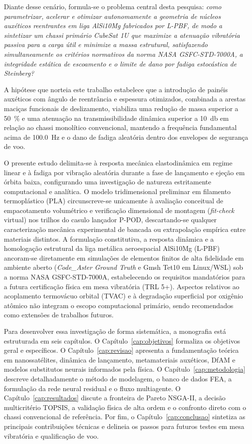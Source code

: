 Diante desse cenário, formula-se o problema central desta pesquisa: \textit{como parametrizar, acelerar e otimizar autonomamente a geometria de núcleos auxéticos reentrantes em liga AlSi10Mg fabricados por L-PBF, de modo a sintetizar um chassi primário CubeSat 1U que maximize a atenuação vibratória passiva para a carga útil e minimize a massa estrutural, satisfazendo simultaneamente os critérios normativos da norma NASA GSFC-STD-7000A, a integridade estática de escoamento e o limite de dano por fadiga estocástica de Steinberg?}

A hipótese que norteia este trabalho estabelece que a introdução de painéis auxéticos com ângulo de reentrância e espessura otimizados, combinada a arestas maciças funcionais de deslizamento, viabiliza uma redução de massa superior a \SI{50}{\percent} e uma atenuação na transmissibilidade dinâmica superior a \SI{10}{\decibel} em relação ao chassi monolítico convencional, mantendo a frequência fundamental acima de \SI{100.0}{\hertz} e o dano de fadiga aleatória dentro dos envelopes de segurança de voo.

O presente estudo delimita-se à resposta mecânica elastodinâmica em regime linear e à fadiga por vibração aleatória durante a fase de lançamento e ejeção em órbita baixa, configurando uma investigação de natureza estritamente computacional e analítica. O modelo tridimensional preliminar em filamento termoplástico (PLA) circunscreve-se unicamente à avaliação conceitual de empacotamento volumétrico e verificação dimensional de montagem (\textit{fit-check} virtual) nos trilhos do casulo lançador P-POD, descartando-se qualquer caracterização mecânica experimental de bancada ou extrapolação empírica entre materiais distintos. A formulação constitutiva, a resposta dinâmica e a homologação estrutural da liga metálica aeroespacial AlSi10Mg (L-PBF) ancoram-se diretamente em simulações de elementos finitos de alta fidelidade em ambiente aberto (\textit{Code\_Aster Ground Truth} e Gmsh Tet10 em Linux/WSL) sob a norma NASA GSFC-STD-7000A, estabelecendo os requisitos mandatórios para a futura certificação física em mesa vibratória (TRL 5+). Aspectos relativos ao acoplamento termovácuo orbital (TVAC) e à degradação superficial por oxigênio atômico não integram o escopo computacional primário, sendo recomendados como extensões de trabalhos futuros.

Para desenvolver essa investigação de forma sistemática, a monografia está estruturada em seis capítulos. O Capítulo~\ref{cap:objetivos} formaliza os objetivos geral e específicos. O Capítulo~\ref{cap:revisao} apresenta a fundamentação teórica em nanossatélites, dinâmica de lançamento, metamateriais auxéticos, DfAM e modelos substitutos neurais informados pela física. O Capítulo~\ref{cap:metodologia} descreve detalhadamente o método de modelagem, o banco de dados FEA, a formulação da rede neural residual e o fluxo multiagente. O Capítulo~\ref{cap:resultados} discute a fronteira de Pareto NSGA-II, a decisão multicritério TOPSIS, a validação física de alta ordem e o confronto direto com o chassi convencional de referência. Por fim, o Capítulo~\ref{cap:conclusao} sintetiza as principais contribuições técnicas e delineia os passos para futuros testes em mesa vibratória e qualificação de voo.
